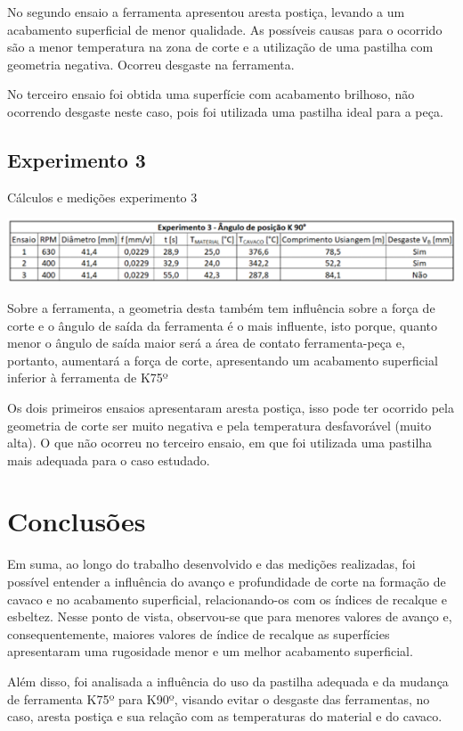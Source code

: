 \documentclass[deposito, acronym, symbols]{fei}
\begin{document}
No segundo ensaio a ferramenta apresentou aresta postiça, levando a um acabamento superficial de menor qualidade. As possíveis causas para o ocorrido são a menor temperatura na zona de corte e a utilização de uma pastilha com geometria negativa. Ocorreu desgaste na ferramenta.

No terceiro ensaio foi obtida uma superfície com acabamento brilhoso, não ocorrendo desgaste neste caso, pois foi utilizada uma pastilha ideal para a peça. 

\section{Experimento 3}

 \begin{table}[!htb]
 \centering
    \caption{Cálculos e medições experimento 3}
    \includegraphics[width=1\linewidth]{Imagens/exp03_exp3dados.png}
    \label{tab:exp3dados}
 \end{table}
 
Sobre a ferramenta, a geometria desta também tem influência sobre a força de corte e o ângulo de saída da ferramenta é o mais influente, isto porque, quanto menor o ângulo de saída maior será a área de contato ferramenta-peça e, portanto, aumentará a força de corte, apresentando um acabamento superficial inferior à ferramenta de K75º

Os dois primeiros ensaios apresentaram aresta postiça, isso pode ter ocorrido pela geometria de corte ser muito negativa e pela temperatura desfavorável (muito alta). O que não ocorreu no terceiro ensaio, em que foi utilizada uma pastilha mais adequada para o caso estudado.


\chapter{Conclusões}

Em suma, ao longo do trabalho desenvolvido e das medições realizadas, foi possível entender a influência do avanço e profundidade de corte na formação de cavaco e no acabamento superficial, relacionando-os com os índices de recalque e esbeltez. Nesse ponto de vista, observou-se que para menores valores de avanço e, consequentemente, maiores valores de índice de recalque as superfícies apresentaram uma rugosidade menor e um melhor acabamento superficial.

Além disso, foi analisada a influência do uso da pastilha adequada e da mudança de ferramenta K75º para K90º, visando evitar o desgaste das ferramentas, no caso, aresta postiça e sua relação com as temperaturas do material e do cavaco.


\printbibliography
\end{document}
